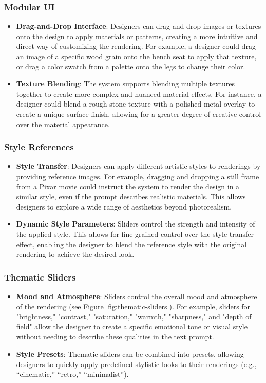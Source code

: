 \subsubsection{Modular UI}
\begin{itemize}
\item \textbf{Drag-and-Drop Interface}: Designers can drag and drop images or textures onto the design to apply materials or patterns, creating a more intuitive and direct way of customizing the rendering. For example, a designer could drag an image of a specific wood grain onto the bench seat to apply that texture, or drag a color swatch from a palette onto the legs to change their color.
\item \textbf{Texture Blending}: The system supports blending multiple textures together to create more complex and nuanced material effects. For instance, a designer could blend a rough stone texture with a polished metal overlay to create a unique surface finish, allowing for a greater degree of creative control over the material appearance.
\end{itemize}

\subsubsection{Style References}
\begin{itemize}
\item \textbf{Style Transfer}: Designers can apply different artistic styles to renderings by providing reference images. For example, dragging and dropping a still frame from a Pixar movie could instruct the system to render the design in a similar style, even if the prompt describes realistic materials. This allows designers to explore a wide range of aesthetics beyond photorealism.
\item \textbf{Dynamic Style Parameters}: Sliders control the strength and intensity of the applied style. This allows for fine-grained control over the style transfer effect, enabling the designer to blend the reference style with the original rendering to achieve the desired look.
\end{itemize}

\subsubsection{Thematic Sliders}
\begin{itemize}
\item \textbf{Mood and Atmosphere}: Sliders control the overall mood and atmosphere of the rendering (see Figure \ref{fig:thematic-sliders}). For example, sliders for "brightness," "contrast," "saturation," "warmth," "sharpness," and "depth of field" allow the designer to create a specific emotional tone or visual style without needing to describe these qualities in the text prompt.
\item \textbf{Style Presets}: Thematic sliders can be combined into presets, allowing designers to quickly apply predefined stylistic looks to their renderings (e.g., “cinematic,” “retro,” “minimalist”).
\end{itemize}

